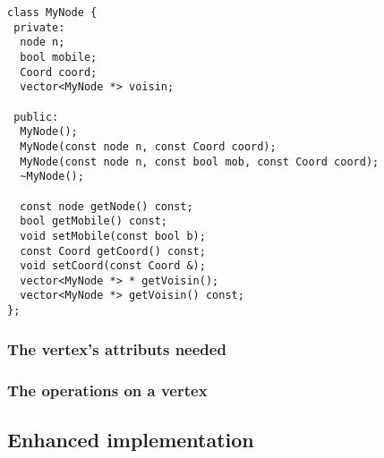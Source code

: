 \newpage
\begin{lstlisting}
class MyNode {
 private:
  node n;
  bool mobile;
  Coord coord;  
  vector<MyNode *> voisin;

 public:
  MyNode();
  MyNode(const node n, const Coord coord);
  MyNode(const node n, const bool mob, const Coord coord);
  ~MyNode();
  
  const node getNode() const;
  bool getMobile() const;
  void setMobile(const bool b);
  const Coord getCoord() const;
  void setCoord(const Coord &);
  vector<MyNode *> * getVoisin();
  vector<MyNode *> getVoisin() const;
};
\end{lstlisting}

\subsubsection{The vertex's attributs needed}


\subsubsection{The operations on a vertex}

\subsection{Enhanced implementation}
